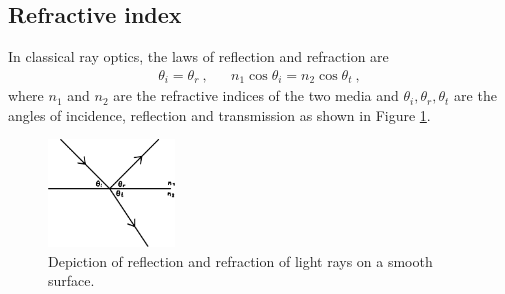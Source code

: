 \enlargethispage{2\baselineskip}



\subsection{Refractive index}

In classical ray optics, the laws of reflection and refraction are
\begin{align}
	\theta_i = \theta_r \: , && n_1 \cos\theta_i = n_2 \cos\theta_t \: ,
	\label{eqn:snell}
\end{align}
where $n_1$ and $n_2$ are the refractive indices of the two media and $\theta_i, \theta_r, \theta_t$ are the angles of incidence, reflection
and transmission as shown in Figure \ref{fig:fresnel}.

\begin{figure}[H]
	\centering
	\includegraphics[width=0.3\textwidth]{content/graphics/fresnel.pdf}
	\caption{Depiction of reflection and refraction of light rays on a smooth surface.}
	\label{fig:fresnel}
\end{figure}

